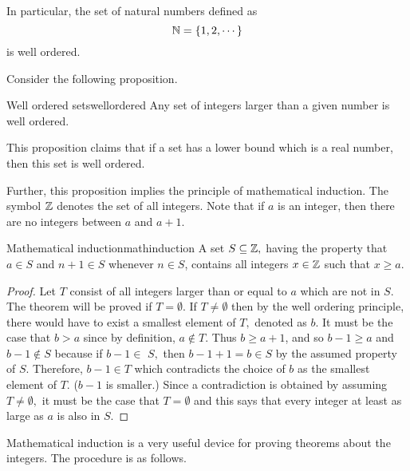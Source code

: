 In particular, the set of natural numbers defined as
\begin{equation*}
\mathbb{N} = \left\{ 1,2,\cdots \right\}
\end{equation*}
is well ordered.

Consider the following proposition.

\begin{proposition}{Well ordered sets}{wellordered}
Any set of integers larger than a given number is well ordered.
\end{proposition}

This proposition claims that if a set has a lower bound which is a real number, 
then this set is well ordered.

Further, this proposition implies the principle of mathematical induction. The symbol $\mathbb{Z}$ denotes the set of all
integers. Note that if $a$ is an integer, then there are no integers between
$a$ and $a+1.$

\begin{theorem}{Mathematical induction}{mathinduction}
 A set $S\subseteq \mathbb{Z},$ having
the property that $a\in S$ and $n+1\in S$ whenever $n\in S$, contains all
integers $x\in \mathbb{Z}$ such that $x\geq a.$
\end{theorem}

\begin{proof} 
Let $T$ consist of all integers larger than or equal to $a$
which are not in $S.$ The theorem will be proved if $T=\emptyset .$ If 
$T\neq \emptyset $ then by the well ordering principle, there would have to
exist a smallest element of $T,$ denoted as $b.$ It must be the case that 
$b>a$ since by definition, $a\notin T.$ Thus $b\geq a+1$, and so $b-1\geq a$
and $b-1\notin S$ because if $b-1\in $ $S,$ then $b-1+1=b\in S$ by the
assumed property of $S.$ Therefore, $b-1\in T$ which contradicts the choice
of $b$ as the smallest element of $T.$ ($b-1$ is smaller.) Since a
contradiction is obtained by assuming $T\neq \emptyset ,$ it must be the
case that $T=\emptyset $ and this says that every integer at least as large
as $a$ is also in $S$.
\end{proof}

Mathematical induction is a very useful device for proving theorems about
the integers. The procedure is as follows.

